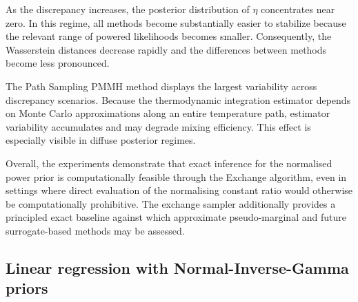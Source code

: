 As the discrepancy increases, the posterior distribution of $\eta$ concentrates near zero.
In this regime, all methods become substantially easier to stabilize because the relevant range of powered likelihoods becomes smaller.
Consequently, the Wasserstein distances decrease rapidly and the differences between methods become less pronounced.

The Path Sampling PMMH method displays the largest variability across discrepancy scenarios.
Because the thermodynamic integration estimator depends on Monte Carlo approximations along an entire temperature path, estimator variability accumulates and may degrade mixing efficiency.
This effect is especially visible in diffuse posterior regimes.

Overall, the experiments demonstrate that exact inference for the normalised power prior is computationally feasible through the Exchange algorithm, even in settings where direct evaluation of the normalising constant ratio would otherwise be computationally prohibitive.
The exchange sampler additionally provides a principled exact baseline against which approximate pseudo-marginal and future surrogate-based methods may be assessed.

\subsection{Linear regression with Normal-Inverse-Gamma priors}
\label{subsec:nig-lm-experiment}

